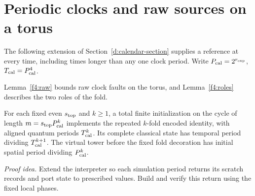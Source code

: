 \section{Periodic clocks and raw sources on a torus}\label{app:f4-calendar}
The following extension of Section~\ref{d:calendar-section} supplies a
reference at every time, including times longer than any one clock
period. Write \(P_{\rm cal}=2^{r_{\rm exp}}\), \(T_{\rm cal}=P_{\rm cal}^4\).

Lemma~\ref{f4:raw} bounds raw clock faults on the torus, and Lemma~\ref{f4:roles} describes the two roles of the fold.

\begin{lemma}\label{f4:periodic}
For each fixed even \(s_{\rm top}\) and \(k\ge1\), a total finite
initialization on the cycle of length \(m=s_{\rm top}P_{\rm cal}^k\) implements the
repeated \(k\)-fold encoded identity, with aligned quantum periods
\(T_{\rm cal}^k\). Its complete classical state has temporal period dividing
\(T_{\rm cal}^{k+1}\). The virtual tower before the fixed fold decoration has initial spatial period dividing \(P_{\rm cal}^k\).
\end{lemma}
\par\noindent\emph{Proof idea.} Extend the interpreter so each simulation period returns its scratch records and port state to prescribed values. Build and verify this return using the fixed local phases.

